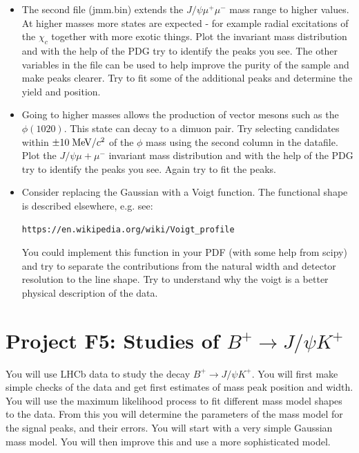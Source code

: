 \begin{enumerate}
\begin{itemize}
\item The second file (jmm.bin) extends the $J/\psi \mu^+ \mu^-$ mass range to higher values. At higher masses more states are expected - for example radial excitations of the $\chi_c$ together with more exotic things. Plot the invariant mass distribution and with the help of the PDG try to identify the peaks you see. The other variables in the file can be used to help improve the purity of the sample and make peaks clearer. Try to fit some of the additional peaks and determine the yield and position.
\item Going to higher masses allows the production of vector mesons such as the $\phi(1020)$. This state can decay to a dimuon pair. Try selecting candidates within $\pm 10\; {\rm MeV}/c^2$ of the $\phi$ mass using the second column in the datafile. Plot the $J/\psi \mu+ \mu^-$  invariant mass distribution and with the help of the PDG try to identify the peaks you see. Again try to fit the peaks.
\item Consider replacing the Gaussian with a Voigt function. The functional shape is described elsewhere, e.g. see:
\begin{verbatim}
https://en.wikipedia.org/wiki/Voigt_profile 
\end{verbatim} 
You could implement this function in your PDF (with some help from scipy) and try to separate the contributions from the natural width and detector resolution to the line shape. Try to understand why the voigt is a better physical description of the data.

\end{itemize}



\end{enumerate}

 


\newpage
\section{Project F5: Studies of $B^+ \rightarrow J/\psi K^+$}
%
You will use LHCb data to study the decay  $B^+ \rightarrow J/\psi K^+$. You will first make simple checks of the data and get first estimates of mass peak position and width. You will use the maximum likelihood process to fit different mass model shapes to the data. From this you will determine the parameters of the mass model for the signal peaks, and their errors. You will start with a very simple Gaussian mass model. You will then improve this and use a more sophisticated model. 

